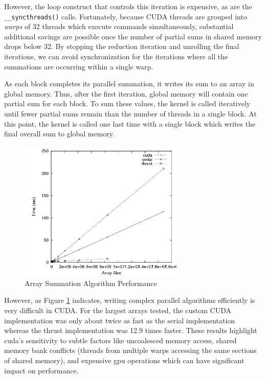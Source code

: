 \documentclass{article}
\begin{document}
However, the loop construct that controls this iteration is expensive, as are the \verb!__syncthreads()! calls. Fortunately, because CUDA threads are grouped into \emph{warps} of 32 threads which execute commands simultaneously, substantial additional savings are possible once the number of partial sums in shared memory drops below 32. By stopping the reduction iteration and unrolling the final iterations, we can avoid synchronization for the iterations where all the summations are occurring within a single warp.

As each block completes its parallel summation, it writes its sum to an array in global memory. Thus, after the first iteration, global memory will contain one partial sum for each block. To sum these values, the kernel is called iteratively until fewer partial sums remain than the number of threads in a single block. At this point, the kernel is called one last time with a single block which writes the final overall sum to global memory.

\begin{figure}
\centering
\includegraphics[width=0.7\textwidth]{data/summation_plot.png}
\caption{Array Summation Algorithm Performance}
\label{summation_plot}
\end{figure}

However, as Figure \ref{summation_plot} indicates, writing complex parallel algorithms efficiently is very difficult in CUDA. For the largest arrays tested, the custom CUDA implementation was only about twice as fast as the serial implementation whereas the thrust implementation was 12.9 times faster. These results highlight cuda's sensitivity to subtle factors like uncoalesced memory access, shared memory bank conflicts (threads from multiple warps accessing the same sections of shared memory), and expensive gpu operations which can have significant impact on performance.\cite{bestprac}
\end{document}
